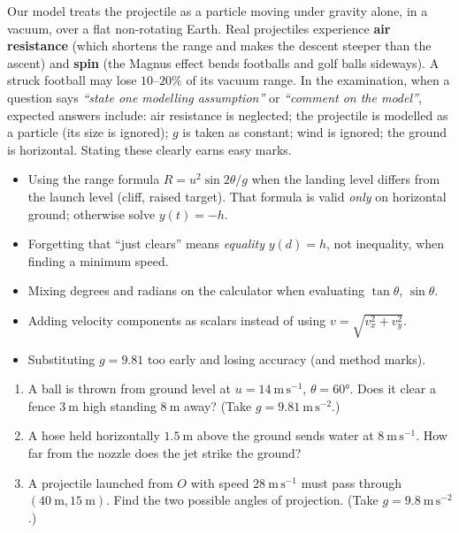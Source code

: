 \documentclass[11pt]{article}
\newcommand{\cle}[1]{{\popxbold\color{popdark}#1}}
\begin{document}
\begin{savaistu}
Our model treats the projectile as a \cle{particle} moving under gravity alone, in a vacuum, over a flat non-rotating Earth. Real projectiles experience \textbf{air resistance} (which shortens the range and makes the descent steeper than the ascent) and \textbf{spin} (the Magnus effect bends footballs and golf balls sideways). A struck football may lose $10$--$20\%$ of its vacuum range. In the examination, when a question says \emph{``state one modelling assumption''} or \emph{``comment on the model''}, expected answers include: air resistance is neglected; the projectile is modelled as a particle (its size is ignored); $g$ is taken as constant; wind is ignored; the ground is horizontal. Stating these clearly earns easy marks.
\end{savaistu}

\begin{attention}
\begin{itemize}
\item Using the range formula $R = u^2\sin 2\theta / g$ when the landing level differs from the launch level (cliff, raised target). That formula is valid \emph{only} on horizontal ground; otherwise solve $y(t) = -h$.
\item Forgetting that ``just clears'' means \emph{equality} $y(d) = h$, not inequality, when finding a minimum speed.
\item Mixing degrees and radians on the calculator when evaluating $\tan\theta$, $\sin\theta$.
\item Adding velocity components as scalars instead of using $v = \sqrt{v_x^2 + v_y^2}$.
\item Substituting $g = 9.81$ too early and losing accuracy (and method marks).
\end{itemize}
\end{attention}

\begin{exercice}[Practice]
\begin{enumerate}
\item A ball is thrown from ground level at $u = 14\ \mathrm{m\,s^{-1}}$, $\theta = 60°$. Does it clear a fence $3\ \mathrm{m}$ high standing $8\ \mathrm{m}$ away? (Take $g = 9.81\ \mathrm{m\,s^{-2}}$.)
\item A hose held horizontally $1.5\ \mathrm{m}$ above the ground sends water at $8\ \mathrm{m\,s^{-1}}$. How far from the nozzle does the jet strike the ground?
\item A projectile launched from $O$ with speed $28\ \mathrm{m\,s^{-1}}$ must pass through $(40\ \mathrm{m}, 15\ \mathrm{m})$. Find the two possible angles of projection. (Take $g = 9.8\ \mathrm{m\,s^{-2}}$.)
\end{enumerate}
\end{exercice}
\end{document}
